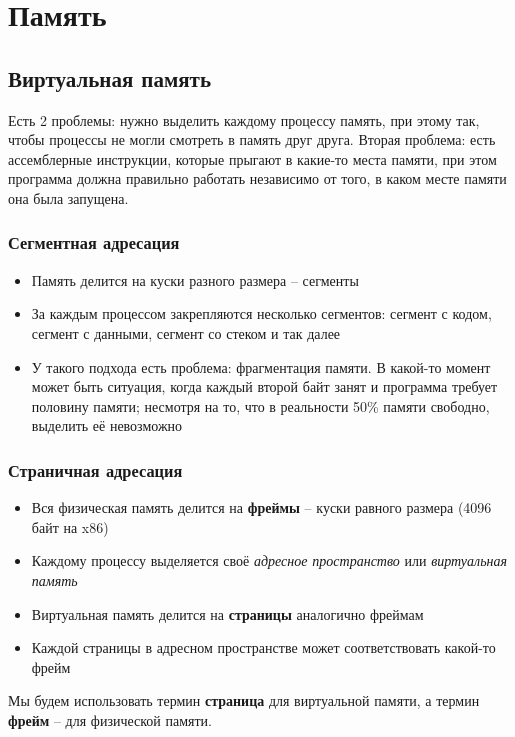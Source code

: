 \section{Память}
  \subsection{Виртуальная память}
    Есть 2 проблемы: нужно выделить каждому процессу память, при этому так, чтобы процессы не могли смотреть в память друг друга. Вторая проблема: есть ассемблерные инструкции, которые прыгают в какие-то места памяти, при этом программа должна правильно работать независимо от того, в каком месте памяти она была запущена.   
  
  \subsubsection{Сегментная адресация}
    \begin{itemize}
      \item Память делится на куски разного размера -- сегменты
      \item За каждым процессом закрепляются несколько сегментов: сегмент с кодом, сегмент с данными, сегмент со стеком и так далее
      \item У такого подхода есть проблема: фрагментация памяти. В какой-то момент может быть ситуация, когда каждый второй байт занят и программа требует половину памяти; несмотря на то, что в реальности 50\% памяти свободно, выделить её невозможно
    \end{itemize}
  
  \subsubsection{Страничная адресация}
    \begin{itemize}
      \item Вся физическая память делится на \textbf{фреймы} -- куски равного размера (4096 байт на x86)
      \item Каждому процессу выделяется своё \textit{адресное пространство} или \textit{виртуальная память}
      \item Виртуальная память делится на \textbf{страницы} аналогично фреймам
      \item Каждой страницы в адресном пространстве может соответствовать какой-то фрейм
    \end{itemize}
    Мы будем использовать термин \textbf{страница} для виртуальной памяти, а термин \textbf{фрейм} -- для физической памяти.
  

